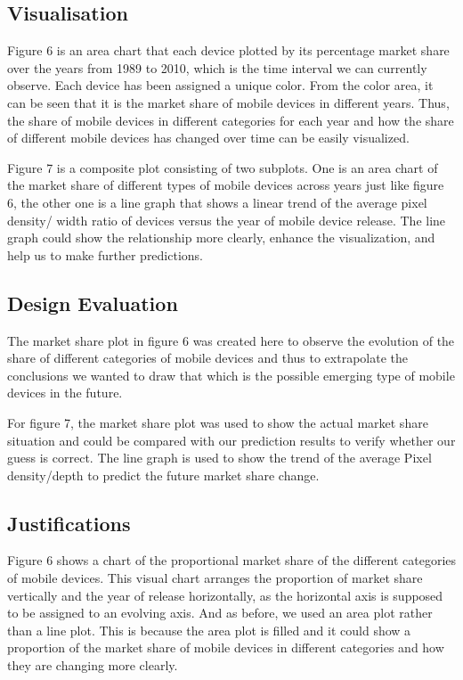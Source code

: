 \documentclass[conference]{IEEEtran}
\begin{document}
\subsection{Visualisation}
Figure 6 is an area chart that each device plotted by its percentage market share over the years from 1989 to 2010, which is the time interval we can currently observe. Each device has been assigned a unique color. From the color area, it can be seen that it is the market share of mobile devices in different years. Thus, the share of mobile devices in different categories for each year and how the share of different mobile devices has changed over time can be easily visualized.

Figure 7 is a composite plot consisting of two subplots. One is an area chart of the market share of different types of mobile devices across years just like figure 6, the other one is a line graph that shows a linear trend of the average pixel density/ width ratio of devices versus the year of mobile device release. The line graph could show the relationship more clearly, enhance the visualization, and help us to make further predictions.

\subsection{Design Evaluation}
The market share plot in figure 6 was created here to observe the evolution of the share of different categories of mobile devices and thus to extrapolate the conclusions we wanted to draw that which is the possible emerging type of mobile devices in the future.

For figure 7, the market share plot was used to show the actual market share situation and could be compared with our prediction results to verify whether our guess is correct. The line graph is used to show the trend of the average Pixel density/depth to predict the future market share change.

\subsection{Justifications}
Figure 6 shows a chart of the proportional market share of the different categories of mobile devices. This visual chart arranges the proportion of market share vertically and the year of release horizontally, as the horizontal axis is supposed to be assigned to an evolving axis. And as before, we used an area plot rather than a line plot. This is because the area plot is filled and it could show a proportion of the market share of mobile devices in different categories and how they are changing more clearly. 
\end{document}
